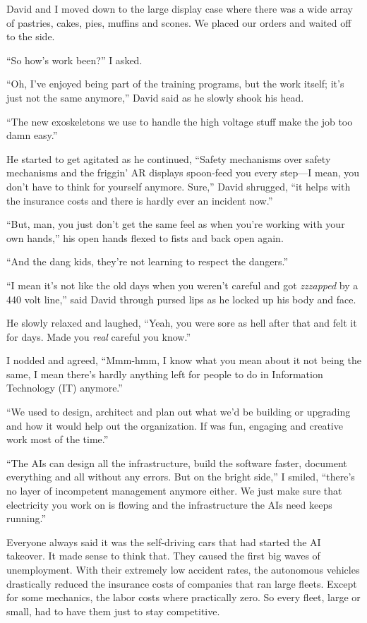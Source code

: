 David and I moved down to the large display case where there
was a wide array of pastries, cakes, pies, muffins and scones.
We placed our orders and waited off to the side.

``So how's work been?'' I asked.

``Oh, I've enjoyed being part of the training programs, but the
work itself; it's just not the same anymore,'' David said as he
slowly shook his head.

``The new exoskeletons we use to handle the high voltage stuff
make the job too damn easy.''

He started to get agitated as he continued, ``Safety mechanisms
over safety mechanisms and the friggin' AR displays spoon-feed
you every step---I mean, you don't have to think for yourself
anymore. Sure,'' David shrugged, ``it helps with the
insurance costs and there is hardly ever an incident now.''

``But, man, you just don't get the same feel as when you're
working with your own hands,'' his open hands
flexed to fists and back open again.

``And the dang kids, they're not learning
to respect the dangers.''

``I mean it's not like the old days when you weren't careful and
got \emph{zzzapped} by a 440 volt line,'' said David through
pursed lips as he locked up his body and face.

He slowly relaxed and laughed,
``Yeah, you were sore as hell after that and felt it for
days. Made you \emph{real} careful you know.''

I nodded and agreed, ``Mmm-hmm, I know what you mean about it not
being the same, I mean there's hardly anything left for people
to do in Information Technology (IT) anymore.''

``We used to design, architect and plan out what we'd be
building or upgrading and how it would help out the
organization. If was fun, engaging and creative work most of the
time.''

``The AIs can design all the infrastructure, build the software
faster, document everything and all without any errors.  But on
the bright side,'' I smiled, ``there's no layer of incompetent
management anymore either. We just make sure that electricity
you work on is flowing and the infrastructure the AIs need keeps
running.''

\subsectsep

Everyone always said it was the self-driving cars that had
started the AI takeover. It made sense to think that. They
caused the first big waves of unemployment. With their extremely
low accident rates, the autonomous vehicles drastically
reduced the insurance costs of companies that ran large fleets.
Except for some mechanics, the labor costs where practically
zero. So every fleet, large or small, had to have them just to
stay competitive.

